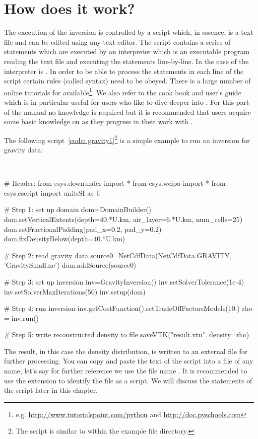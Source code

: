 \section{How does it work?}
The execution of the inversion is controlled by a script which, in essence, is
a text file and can be edited using any text editor.
The script contains a series of statements which are executed by an
interpreter which is an executable program reading the text file and executing
the statements line-by-line.
In the case of \downunder the interpreter is \Python.
In order to be able to process the statements in each line of the script
certain rules (called syntax) need to be obeyed.
There is a large number of online tutorials for \Python available\footnote{e.g.
\url{http://www.tutorialspoint.com/python} and \url{http://doc.pyschools.com}}.
We also refer to the \escript cook book \cite{ESCRIPTCOOKBOOK} and user's
guide \cite{ESCRIPT} which is in particular useful for users who like to dive
deeper into \downunder.
For this part of the manual no \Python knowledge is required but it is
recommended that users acquire some basic knowledge on \Python as they
progress in their work with \downunder.

The following script~\ref{code: gravity1}\footnote{The script is similar to
 within the \escript example file directory.} is a
simple example to run an inversion for gravity data:

\begin{pyc}\label{code: gravity1}
\
\begin{python}
# Header:
from esys.downunder import *
from esys.weipa import *
from esys.escript import unitsSI as U

# Step 1: set up domain
dom=DomainBuilder()
dom.setVerticalExtents(depth=40.*U.km, air_layer=6.*U.km, num_cells=25)
dom.setFractionalPadding(pad_x=0.2, pad_y=0.2)
dom.fixDensityBelow(depth=40.*U.km)

# Step 2: read gravity data
source0=NetCdfData(NetCdfData.GRAVITY, 'GravitySmall.nc')
dom.addSource(source0)

# Step 3: set up inversion
inv=GravityInversion()
inv.setSolverTolerance(1e-4)
inv.setSolverMaxIterations(50)
inv.setup(dom)

# Step 4: run inversion 
inv.getCostFunction().setTradeOffFactorsModels(10.) 
rho = inv.run()

# Step 5: write reconstructed density to file
saveVTK("result.vtu", density=rho)
\end{python}
\end{pyc}
The result, in this case the density distribution, is written to an external
file for further processing. You can copy and paste the text of the script
into a file of any name, let's say for further reference we use the file
name \file{grav.py}.
It is recommended to use the extension  to identify the file as a
\Python script.
We will discuss the statements of the script later in this chapter. 

